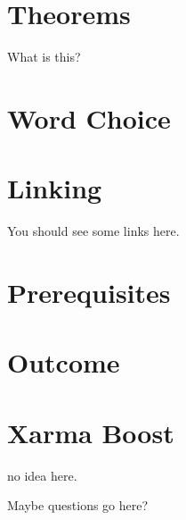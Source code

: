 \documentclass{ximera}
\begin{document}
\section{Theorems}

\begin{theorems}
What is this?
\end{theorems}



\section{Word Choice}



\section{Linking}

You should see some links here.

\link{}



\section{Prerequisites}




\section{Outcome}




\section{Xarma Boost}

\begin{xarmaBoost}
no idea here.

\begin{question}
Maybe questions go here? 
\end{question}
\end{xarmaBoost}
\end{document}

